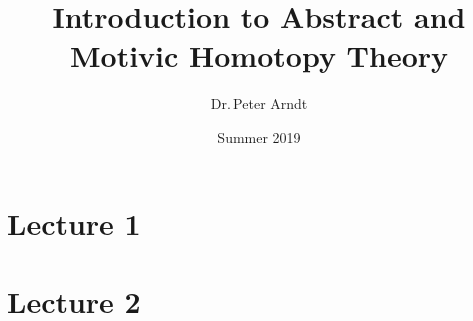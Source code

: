 \documentclass[twoside, a4paper]{report}
\title{Introduction to Abstract and Motivic Homotopy Theory}
\author{Dr.\,Peter Arndt}
\date{Summer 2019}
\begin{document}
\maketitle

\tableofcontents
\newpage

\chapter{Lecture 1}


\chapter{Lecture 2}

\end{document}
